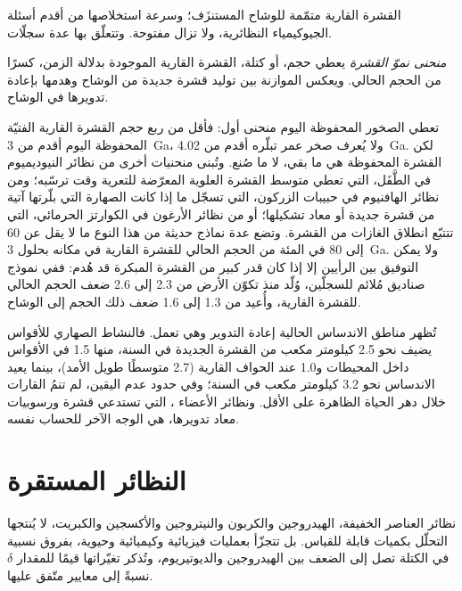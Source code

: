 القشرة القارية متمّمة للوشاح المستنزَف؛ وسرعة
استخلاصها من أقدم أسئلة الجيوكيمياء النظائرية، ولا تزال
مفتوحة. وتتعلّق بها عدة سجلّات.

\begin{definition}\label{def:b2:isotope-geochemistry:growth}
\emph{منحنى نموّ القشرة} يعطي حجم، أو
كتلة، القشرة القارية الموجودة بدلالة الزمن، كسرًا من
الحجم الحالي. ويعكس الموازنة بين توليد قشرة جديدة
من الوشاح وهدمها بإعادة تدويرها في الوشاح.
\end{definition}

تعطي الصخور المحفوظة اليوم منحنى أول: فأقل من ربع حجم
القشرة القارية الفتيّة المحفوظة اليوم أقدم من \qty{3}{Ga}،
ولا يُعرف صخر عمر تبلّره أقدم من \qty{4.02}{Ga}. لكن القشرة
المحفوظة هي ما بقي، لا ما صُنع. وتُبنى منحنيات أخرى من
نظائر النيوديميوم في الطَّفَل، التي تعطي متوسط القشرة العلوية المعرّضة
للتعرية وقت ترسّبه؛ ومن نظائر الهافنيوم في حبيبات
الزركون، التي تسجّل ما إذا كانت الصهارة التي بلّرتها آتية من قشرة جديدة أو
معاد تشكيلها؛ أو من نظائر الأرغون في الكوارتز الحرمائي، التي تتتبّع
انطلاق الغازات من القشرة. وتضع عدة نماذج حديثة من هذا النوع ما لا يقل عن 60
إلى 80 في المئة من الحجم الحالي للقشرة القارية في مكانه بحلول
\qty{3}{Ga}. ولا يمكن التوفيق بين الرأيين إلا إذا كان قدر كبير من القشرة المبكرة
قد هُدم: ففي نموذج صناديق مُلائم للسجلّين، وُلّد منذ تكوّن الأرض من 2.3 إلى 2.6 ضعف
الحجم الحالي للقشرة القارية،
وأُعيد من 1.3 إلى 1.6 ضعف ذلك الحجم إلى الوشاح.

تُظهر مناطق الاندساس الحالية إعادة التدوير وهي تعمل. فالنشاط الصهاري للأقواس يضيف
نحو 2.5 كيلومتر مكعب من القشرة الجديدة في السنة، منها 1.5 في الأقواس داخل المحيطات
و1.0 عند الحواف القارية (2.7 متوسطًا طويل الأمد)، بينما يعيد الاندساس
نحو 3.2 كيلومتر مكعب في السنة؛ وفي حدود عدم اليقين، لم تنمُ
القارات خلال دهر الحياة الظاهرة على الأقل. ونظائر الأعضاء
، التي تستدعي قشرة ورسوبيات معاد تدويرها، هي الوجه الآخر
للحساب نفسه.

\section{النظائر المستقرة}

نظائر العناصر الخفيفة، الهيدروجين والكربون والنيتروجين والأكسجين
والكبريت، لا يُنتجها التحلّل بكميات قابلة للقياس. بل تتجزّأ
بعمليات فيزيائية وكيميائية وحيوية، بفروق نسبية في الكتلة
تصل إلى الضعف بين الهيدروجين والديوتيريوم، وتُذكر
تغيّراتها قيمًا للمقدار $\delta$ نسبةً إلى معايير متّفق عليها.

